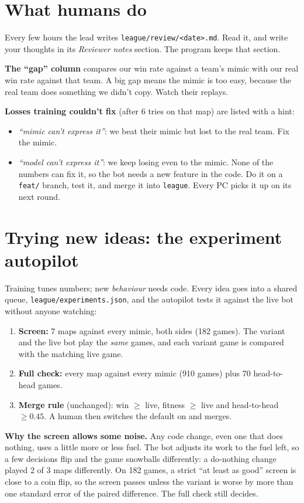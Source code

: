 \documentclass[11pt,a4paper]{article}
\newcommand{\f}[1]{\texttt{#1}}
\begin{document}
\section{What humans do}
Every few hours the lead writes \f{league/review/<date>.md}. Read it, and write your thoughts in its
\emph{Reviewer notes} section. The program keeps that section.

\textbf{The ``gap'' column} compares our win rate against a team's mimic with our real win rate against
that team. A big gap means the mimic is too easy, because the real team does something we didn't copy.
Watch their replays.

\textbf{Losses training couldn't fix} (after 6 tries on that map) are listed with a hint:
\begin{itemize}
\item \emph{``mimic can't express it''}: we beat their mimic but lost to the real team. Fix the mimic.
\item \emph{``model can't express it''}: we keep losing even to the mimic. None of the numbers can fix
  it, so the bot needs a new feature in the code. Do it on a \f{feat/} branch, test it, and merge it
  into \f{league}. Every PC picks it up on its next round.
\end{itemize}

\section{Trying new ideas: the experiment autopilot}\label{sec:exp}
Training tunes numbers; new \emph{behaviour} needs code. Every idea goes into a shared queue,
\f{league/experiments.json}, and the autopilot tests it against the live bot without anyone watching:
\begin{enumerate}[nosep]
\item \textbf{Screen:} 7 maps against every mimic, both sides (182 games). The variant and the live bot
  play the \emph{same} games, and each variant game is compared with the matching live game.
\item \textbf{Full check:} every map against every mimic (910 games) plus 70 head-to-head games.
\item \textbf{Merge rule} (unchanged): win $\ge$ live, fitness $\ge$ live and head-to-head $\ge 0.45$.
  A human then switches the default on and merges.
\end{enumerate}
\textbf{Why the screen allows some noise.} Any code change, even one that does nothing, uses a little
more or less fuel. The bot adjusts its work to the fuel left, so a few decisions flip and the game
snowballs differently: a do-nothing change played 2 of 3 maps differently. On 182 games, a strict
``at least as good'' screen is close to a coin flip, so the screen passes unless the variant is worse
by more than one standard error of the paired difference. The full check still decides.
\end{document}
